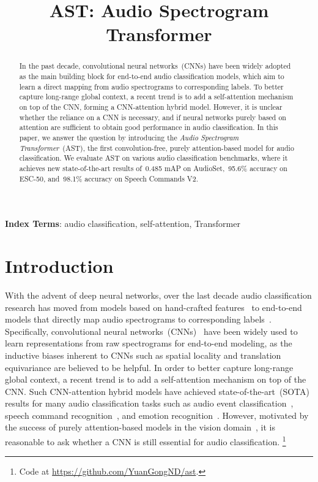 \documentclass[a4paper]{article}
\title{AST: Audio Spectrogram Transformer}
\newcommand\blfootnote[1]{\begingroup
  \renewcommand\thefootnote{}\footnote{#1}\addtocounter{footnote}{-1}\endgroup
}
\begin{document}
\maketitle
\begin{abstract}

In the past decade, convolutional neural networks~(CNNs) have been widely adopted as the main building block for end-to-end audio classification models, which aim to learn a direct mapping from audio spectrograms to corresponding labels. To better capture long-range global context, a recent trend is to add a self-attention mechanism on top of the CNN, forming a CNN-attention hybrid model. However, it is unclear whether the reliance on a CNN is necessary, and if neural networks purely based on attention are sufficient to obtain good performance in audio classification. In this paper, we answer the question by introducing the \emph{Audio Spectrogram Transformer}~(AST), the first convolution-free, purely attention-based model for audio classification. We evaluate AST on various audio classification benchmarks, where it achieves new state-of-the-art results of~0.485 mAP on AudioSet,~95.6\% accuracy on ESC-50, and~98.1\% accuracy on Speech Commands V2. 

\end{abstract}
\noindent\textbf{Index Terms}: audio classification, self-attention, Transformer


\section{Introduction}
\label{sec:intro}

With the advent of deep neural networks, over the last decade audio classification research has moved from models based on hand-crafted features~\cite{eyben2013recent,schuller2013interspeech} to end-to-end models that directly map audio spectrograms to corresponding labels~\cite{jaitly2011learning,dieleman2014end,trigeorgis2016adieu}.
Specifically, convolutional neural networks~(CNNs)~\cite{lecun1995convolutional} have been widely used to learn representations from raw spectrograms for end-to-end modeling, as the inductive biases inherent to CNNs such as spatial locality and translation equivariance are believed to be helpful.
In order to better capture long-range global context, a recent trend is to add a self-attention mechanism on top of the CNN.
Such CNN-attention hybrid models have achieved state-of-the-art~(SOTA) results for many audio classification tasks such as audio event classification~\cite{kong2020panns,gong2021psla}, speech command recognition~\cite{rybakov2020streaming}, and emotion recognition~\cite{li2018attention}.
However, motivated by the success of purely attention-based models in the vision domain~\cite{dosovitskiy2021image,touvron2020deit,yuan2021tokens}, it is reasonable to ask whether a CNN is still essential for audio classification. 
\blfootnote{Code at \url{https://github.com/YuanGongND/ast}.}
\end{document}
